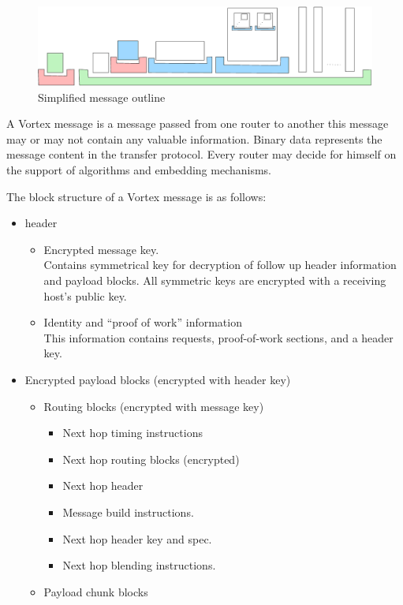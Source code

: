 \begin{figure}[ht]
	\includegraphics[width=\textwidth]{inc/blockLayoutSimplified}
	\caption{Simplified message outline}
	\label{fig:messageOutline}
\end{figure}

A Vortex message is a message passed from one router to another this message may or may not contain any valuable information. Binary data represents the message content in the transfer protocol. Every router may decide for himself on the support of algorithms and embedding mechanisms.

The block structure of a Vortex message is as follows:
\begin{itemize}
	\item header
	\begin{itemize}
		\item Encrypted message key.\\
		Contains symmetrical key for decryption of follow up header information and payload blocks. All symmetric keys are encrypted with a receiving host's public key.
		\item Identity and ``proof of work'' information\\
		This information contains requests, proof-of-work sections, and a header key.
	\end{itemize}
	\item Encrypted payload blocks (encrypted with header key)
	\begin{itemize}
		\item Routing blocks (encrypted with message key)
		\begin{itemize}
			\item Next hop timing instructions
			\item Next hop routing blocks (encrypted)
			\item Next hop header
			\item Message build instructions.
			\item Next hop header key and spec.
			\item Next hop blending instructions.
		\end{itemize}
		\item Payload chunk blocks
	\end{itemize}
\end{itemize}

